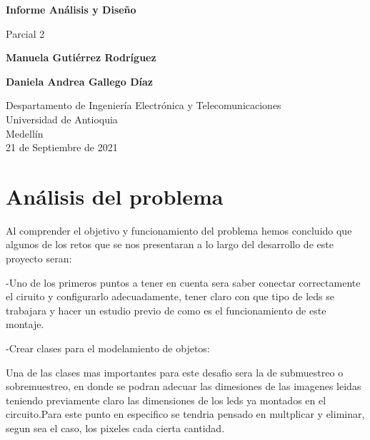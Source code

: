 \documentclass{article}
\begin{document}
\begin{titlepage}
    \begin{center}
        \vspace*{1cm}
            
        \Huge
        \textbf{Informe Análisis y Diseño}
            
        \vspace{0.5cm}
        \LARGE
        Parcial 2
            
        \vspace{1.5cm}
            
        \textbf{Manuela Gutiérrez Rodríguez}
        \vspace{0.5cm}
        
        \textbf{Daniela Andrea Gallego Díaz}
            
        \vfill
            
        \vspace{0.8cm}
            
        \Large
        Despartamento de Ingeniería Electrónica y Telecomunicaciones\\
        Universidad de Antioquia\\
        Medellín\\
        21 de Septiembre de 2021
            
    \end{center}
\end{titlepage}

\tableofcontents
\newpage
\section{Análisis del problema}\label{Analisis}

Al comprender el objetivo y funcionamiento del problema hemos concluido que algunos de los retos que se nos presentaran a lo largo del desarrollo de este proyecto seran:

-Uno de los primeros puntos a tener en cuenta sera saber conectar correctamente el ciruito y configurarlo adecuadamente, tener claro con que tipo de leds se trabajara y hacer un estudio previo de como es el funcionamiento de este montaje.

-Crear clases para el modelamiento de objetos: 

Una de las clases mas importantes para este desafio sera la de submuestreo o sobremuestreo, en donde se podran adecuar las dimesiones de las imagenes leidas teniendo previamente claro las dimensiones de los leds ya montados en el circuito.Para este punto en especifico se tendria pensado en multplicar y eliminar, segun sea el caso, los pixeles cada cierta cantidad.
\end{document}
